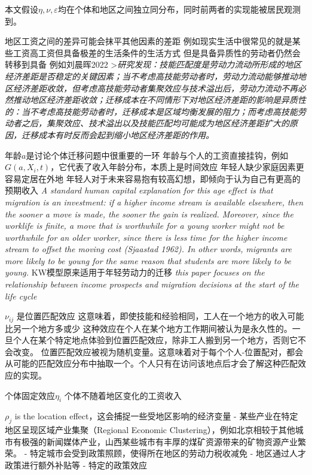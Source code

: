 \documentclass[a4paper,12pt,oneside]{book} %
\begin{document}
本文假设$\eta,\nu,\varepsilon$均在个体和地区之间独立同分布，同时前两者的实现能被居民观测到。

地区工资之间的差异可能会抹平其他因素的差距
例如现实生活中很常见的就是某些工资高工资但具备极差的生活条件的生活方式
但是具备异质性的劳动者仍然会转移到具备
例如刘晨晖2022
>\textit{研究发现：技能匹配度是劳动力流动所形成的地区经济差距是否稳定的关键因素；当不考虑高技能劳动者时，劳动力流动能够推动地区经济差距收敛，但考虑高技能劳动者集聚效应与技术溢出后，劳动力流动不再必然推动地区经济差距收敛；迁移成本在不同情形下对地区经济差距的影响是异质性的：当不考虑高技能劳动者时，迁移成本是区域均衡发展的阻力；而考虑高技能劳动者之后，集聚效应、技术溢出以及技能匹配均可能成为地区经济差距扩大的原因，迁移成本有时反而会起到缩小地区经济差距的作用。}

年龄$a$是讨论个体迁移问题中很重要的一环
年龄与个人的工资直接挂钩，例如$G(a,X_i,t)$，它代表了收入年龄分布，本质上是时间效应
年轻人缺少家庭因素更容易定居在外地
年轻人对于未来容易抱有较高幻想，即倾向于认为自己有更高的预期收入
\textit{A standard human capital explanation for this age effect is that migration is an investment: if a higher income stream is  available elsewhere, then the sooner a move is made, the sooner the gain is realized. Moreover,  since the worklife is finite, a move that is worthwhile for a young worker might not be  worthwhile for an older worker, since there is less time for the higher income stream to offset  the moving cost (Sjaastad 1962). In other words, migrants are more likely to be young for the same reason that students are more likely to be young.}
KW模型原来适用于年轻劳动力的迁移
\textit{this paper focuses on the relationship between income prospects and migration decisions at the start of the life cycle}



$\nu_{ij}$ 是位置匹配效应
这意味着，即使技能和经验相同，工人在一个地方的收入可能比另一个地方多或少
这种效应在个人在某个地方工作期间被认为是永久性的。一旦个人在某个特定地点体验到位置匹配效应，除非工人搬到另一个地方，否则它不会改变。
位置匹配效应被视为随机变量。这意味着对于每个个人-位置配对，都会从可能的匹配效应分布中抽取一个。个人只有在访问该地点后才会了解这种匹配效应的实现。



个体固定效应$\eta_i$
个体不随着地区变化的工资收入



$\rho_j$ is the location effect，这会捕捉一些受地区影响的经济变量
- 某些产业在特定地区呈现区域产业集聚（Regional Economic Clustering），例如北京相较于其他城市有极强的新闻媒体产业，山西某些城市有丰厚的煤矿资源带来的矿物资源产业繁荣。
- 特定城市会受到政策照顾，使得所在地区的劳动力税收减免
- 地区通过人才政策进行额外补贴等
- 特定的政策效应
\end{document}
